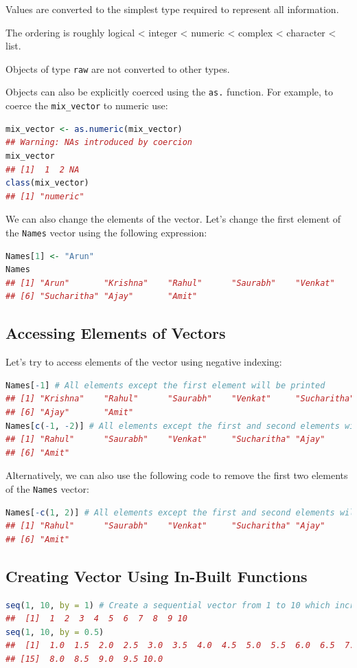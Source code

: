 \documentclass[10pt]{book}
\begin{document}
Values are converted to the simplest type required to represent all information.

The ordering is roughly logical < integer < numeric < complex < character < list.

Objects of type \texttt{raw} are not converted to other types.

Objects can also be explicitly coerced using the \texttt{as.} function. For example, to coerce the \texttt{mix\_vector} to numeric use:
\begin{lstlisting}[language=R]
mix_vector <- as.numeric(mix_vector)
## Warning: NAs introduced by coercion
mix_vector
## [1]  1  2 NA
class(mix_vector)
## [1] "numeric"
\end{lstlisting}

We can also change the elements of the vector. Let’s change the first element of the \texttt{Names} vector using the following expression:
\begin{lstlisting}[language=R]
Names[1] <- "Arun"
Names
## [1] "Arun"       "Krishna"    "Rahul"      "Saurabh"    "Venkat"    
## [6] "Sucharitha" "Ajay"       "Amit"
\end{lstlisting}

\subsection{Accessing Elements of Vectors}
Let’s try to access elements of the vector using negative indexing:
\begin{lstlisting}[language=R]
Names[-1] # All elements except the first element will be printed
## [1] "Krishna"    "Rahul"      "Saurabh"    "Venkat"     "Sucharitha"
## [6] "Ajay"       "Amit"
Names[c(-1, -2)] # All elements except the first and second elements will be printed
## [1] "Rahul"      "Saurabh"    "Venkat"     "Sucharitha" "Ajay"      
## [6] "Amit"
\end{lstlisting}

Alternatively, we can also use the following code to remove the first two elements of the \texttt{Names} vector:
\begin{lstlisting}[language=R]
Names[-c(1, 2)] # All elements except the first and second elements will be printed
## [1] "Rahul"      "Saurabh"    "Venkat"     "Sucharitha" "Ajay"      
## [6] "Amit"
\end{lstlisting}

\subsection{Creating Vector Using In-Built Functions}
\begin{lstlisting}[language=R]
seq(1, 10, by = 1) # Create a sequential vector from 1 to 10 which increases by 1 in length.
##  [1]  1  2  3  4  5  6  7  8  9 10
seq(1, 10, by = 0.5)
##  [1]  1.0  1.5  2.0  2.5  3.0  3.5  4.0  4.5  5.0  5.5  6.0  6.5  7.0  7.5
## [15]  8.0  8.5  9.0  9.5 10.0
\end{lstlisting}
\end{document}
